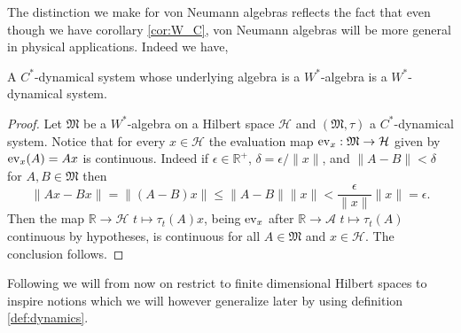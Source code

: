 The distinction we make for von Neumann algebras reflects the fact that even though we have corollary \ref{cor:W_C}, von Neumann algebras will be more general in physical applications. Indeed we have,

\begin{theorem}\label{thm:C_W}
A $C^*$-dynamical system whose underlying algebra is a $W^*$-algebra is a $W^*$-dynamical system.
\end{theorem}

\begin{proof}
Let $\mathfrak{M}$ be a $W^*$-algebra on a Hilbert space $\mathcal{H}$ and $(\mathfrak{M},\tau)$ a $C^*$-dynamical system. Notice that for every $x\in\mathcal{H}$ the evaluation map $\operatorname{ev}_{x}:\mathfrak{M}\rightarrow \mathcal{H}$ given by $\operatorname{ev}_{x}(A)=Ax$ is continuous. Indeed if $\epsilon\in\mathbb{R}^+$, $\delta=\epsilon/\|x\|$, and $\|A-B\|<\delta$ for $A,B\in\mathfrak{M}$ then
\begin{equation}
\|Ax-Bx\|=\|(A-B)x\|\leq\|A-B\|\|x\|<\frac{\epsilon}{\|x\|}\|x\|=\epsilon.
\end{equation}
Then the map $\mathbb{R}\rightarrow\mathcal{H}$ $t\mapsto\tau_t(A)x$, being $\operatorname{ev}_{x}$ after $\mathbb{R}\rightarrow\mathcal{A}$ $t\mapsto\tau_t(A)$ continuous by hypotheses, is continuous for all $A\in\mathfrak{M}$ and $x\in\mathcal{H}$. The conclusion follows.
\end{proof}

Following \cite{Duvenhage1999} we will from now on restrict to finite dimensional Hilbert spaces to inspire notions which we will however generalize later by using definition \ref{def:dynamics}.

